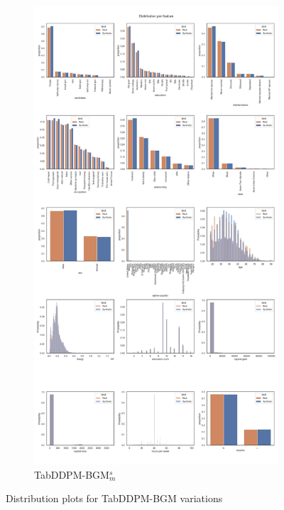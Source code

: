 \begin{landscape}
\begin{figure}[h]
\begin{subfigure}{0.3\linewidth}
			\includegraphics[height=\textheight,width=\linewidth,keepaspectratio]{images/distributions_full/tab-ddpm-bgm-simTune-minmax.jpg}
			\caption{TabDDPM-BGM$^{s}_m$}
		\end{subfigure}
		\caption[Distribution plots TabDDPM-BGM Models]{Distribution plots for TabDDPM-BGM variations}
		\label{fig_a:dist_4}
	\end{figure}
\end{landscape}
